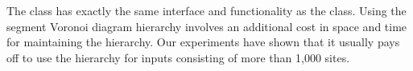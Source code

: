 The class 
has exactly the same interface and functionality as the
class. Using the segment Voronoi diagram hierarchy involves an
additional cost in space and time for maintaining the hierarchy. Our
experiments have shown that it usually pays off to use the hierarchy
for inputs consisting of more than 1,000 sites. 



